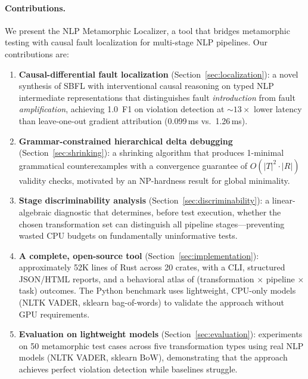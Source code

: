 \documentclass[sigconf,nonacm]{acmart}
\begin{document}
\paragraph{Contributions.}
We present the NLP Metamorphic Localizer, a tool that bridges metamorphic testing with causal fault localization for multi-stage NLP pipelines.
Our contributions are:

\begin{enumerate}
    \item \textbf{Causal-differential fault localization} (Section~\ref{sec:localization}): a novel synthesis of SBFL with interventional causal reasoning on typed NLP intermediate representations that distinguishes fault \emph{introduction} from fault \emph{amplification}, achieving 1.0~F1 on violation detection at ${\sim}13\times$ lower latency than leave-one-out gradient attribution (0.099\,ms vs.\ 1.26\,ms).

    \item \textbf{Grammar-constrained hierarchical delta debugging} (Section~\ref{sec:shrinking}): a shrinking algorithm that produces 1-minimal grammatical counterexamples with a convergence guarantee of $O(|T|^2 \cdot |R|)$ validity checks, motivated by an NP-hardness result for global minimality.

    \item \textbf{Stage discriminability analysis} (Section~\ref{sec:discriminability}): a linear-algebraic diagnostic that determines, before test execution, whether the chosen transformation set can distinguish all pipeline stages---preventing wasted CPU budgets on fundamentally uninformative tests.

    \item \textbf{A complete, open-source tool} (Section~\ref{sec:implementation}): approximately 52K lines of Rust across 20 crates, with a CLI, structured JSON/HTML reports, and a behavioral atlas of (transformation $\times$ pipeline $\times$ task) outcomes.
    The Python benchmark uses lightweight, CPU-only models (NLTK VADER, sklearn bag-of-words) to validate the approach without GPU requirements.

    \item \textbf{Evaluation on lightweight models} (Section~\ref{sec:evaluation}): experiments on 50 metamorphic test cases across five transformation types using real NLP models (NLTK VADER, sklearn BoW), demonstrating that the approach achieves perfect violation detection while baselines struggle.
\end{enumerate}
\end{document}
